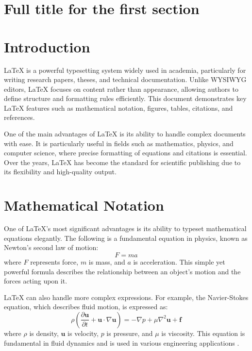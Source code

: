 \section[short title sec 1]{Full title for the first section}


\section{Introduction}
LaTeX is a powerful typesetting system widely used in academia, particularly for writing research papers, theses, and technical documentation. Unlike WYSIWYG editors, LaTeX focuses on content rather than appearance, allowing authors to define structure and formatting rules efficiently. This document demonstrates key LaTeX features such as mathematical notation, figures, tables, citations, and references.

One of the main advantages of LaTeX is its ability to handle complex documents with ease. It is particularly useful in fields such as mathematics, physics, and computer science, where precise formatting of equations and citations is essential. Over the years, LaTeX has become the standard for scientific publishing due to its flexibility and high-quality output.

\section{Mathematical Notation}
One of LaTeX's most significant advantages is its ability to typeset mathematical equations elegantly. The following is a fundamental equation in physics, known as Newton's second law of motion:
\begin{equation}
    F = ma
\end{equation}
where $F$ represents force, $m$ is mass, and $a$ is acceleration. This simple yet powerful formula describes the relationship between an object's motion and the forces acting upon it.

LaTeX can also handle more complex expressions. For example, the Navier-Stokes equation, which describes fluid motion, is expressed as:
\begin{equation}
    \rho \left( \frac{\partial \mathbf{u}}{\partial t} + \mathbf{u} \cdot \nabla \mathbf{u} \right) = - \nabla p + \mu \nabla^2 \mathbf{u} + \mathbf{f}
\end{equation}
where $\rho$ is density, $\mathbf{u}$ is velocity, $p$ is pressure, and $\mu$ is viscosity. This equation is fundamental in fluid dynamics and is used in various engineering applications \cite{batchelor1967}.

